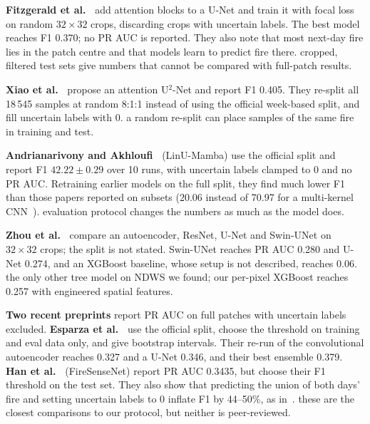 \textbf{Fitzgerald et al.~\cite{fitzgerald2023}} add attention blocks to a U-Net and train it with focal
loss on random $32\times32$ crops, discarding crops with uncertain labels. The best model reaches F1
0.370; no PR AUC is reported. They also note that most next-day fire lies in the patch centre and that
models learn to predict fire there. \relevance{} cropped, filtered test sets give numbers that cannot be
compared with full-patch results.

\textbf{Xiao et al.~\cite{xiao2024}} propose an attention U$^2$-Net and report F1 0.405. They re-split
all 18\,545 samples at random 8:1:1 instead of using the official week-based split, and fill uncertain
labels with 0. \relevance{} a random re-split can place samples of the same fire in training and test.

\textbf{Andrianarivony and Akhloufi~\cite{andrianarivony2025}} (LinU-Mamba) use the official split and
report F1 $42.22 \pm 0.29$ over 10 runs, with uncertain labels clamped to 0 and no PR AUC. Retraining
earlier models on the full split, they find much lower F1 than those papers reported on subsets (20.06
instead of 70.97 for a multi-kernel CNN~\cite{marjani2023}). \relevance{} evaluation protocol changes the
numbers as much as the model does.

\textbf{Zhou et al.~\cite{zhou2025}} compare an autoencoder, ResNet, U-Net and Swin-UNet on $32\times32$
crops; the split is not stated. Swin-UNet reaches PR AUC 0.280 and U-Net 0.274, and an XGBoost baseline,
whose setup is not described, reaches 0.06. \relevance{} the only other tree model on NDWS we found; our
per-pixel XGBoost reaches 0.257 with engineered spatial features.

\textbf{Two recent preprints} report PR AUC on full patches with uncertain labels excluded.
\textbf{Esparza et al.~\cite{esparza2026}} use the official split, choose the threshold on training and
eval data only, and give bootstrap intervals. Their re-run of the convolutional autoencoder reaches 0.327
and a U-Net 0.346, and their best ensemble 0.379. \textbf{Han et al.~\cite{han2026}} (FireSenseNet) report
PR AUC 0.3435, but choose their F1 threshold on the test set. They also show that predicting the union of
both days' fire and setting uncertain labels to 0 inflate F1 by 44--50\%, as in~\cite{luo2026}.
\relevance{} these are the closest comparisons to our protocol, but neither is peer-reviewed.

